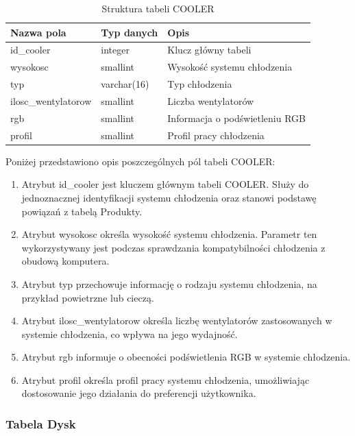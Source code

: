 \documentclass[a4paper,twoside,12pt]{book}
\begin{document}
\begin{table}[H]
\centering
\caption{Struktura tabeli COOLER}
\label{tab:cooler}
\begin{tabular}{lll}
\hline
Nazwa pola & Typ danych & Opis \\ \hline
id\_cooler & integer & Klucz główny tabeli \\
wysokosc & smallint & Wysokość systemu chłodzenia \\
typ & varchar(16) & Typ chłodzenia \\
ilosc\_wentylatorow & smallint & Liczba wentylatorów \\
rgb & smallint & Informacja o podświetleniu RGB \\
profil & smallint & Profil pracy chłodzenia \\ \hline
\end{tabular}
\end{table}

Poniżej przedstawiono opis poszczególnych pól tabeli COOLER:

\begin{enumerate}
    \item Atrybut id\_cooler jest kluczem głównym tabeli COOLER. Służy do
    jednoznacznej identyfikacji systemu chłodzenia oraz stanowi podstawę
    powiązań z tabelą Produkty.

    \item Atrybut wysokosc określa wysokość systemu chłodzenia. Parametr ten
    wykorzystywany jest podczas sprawdzania kompatybilności chłodzenia z
    obudową komputera.

    \item Atrybut typ przechowuje informację o rodzaju systemu chłodzenia,
    na przykład powietrzne lub cieczą.

    \item Atrybut ilosc\_wentylatorow określa liczbę wentylatorów zastosowanych
    w systemie chłodzenia, co wpływa na jego wydajność.

    \item Atrybut rgb informuje o obecności podświetlenia RGB w systemie
    chłodzenia.

    \item Atrybut profil określa profil pracy systemu chłodzenia, umożliwiając
    dostosowanie jego działania do preferencji użytkownika.
\end{enumerate}
\newpage 
\subsubsection{Tabela Dysk}
\end{document}
